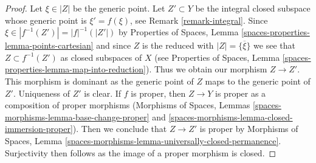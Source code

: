 \documentclass[10pt,a4paper]{amsart}
\theoremstyle{plain}
\theoremstyle{definition}
\theoremstyle{remark}
\numberwithin{equation}{subsection}
\begin{document}
\begin{proof}
Let $\xi \in |Z|$ be the generic point. Let $Z' \subset Y$ be the integral
closed subspace whose generic point is $\xi' = f(\xi)$, see
Remark \ref{remark-integral}. Since $\xi \in |f^{-1}(Z')| = |f|^{-1}(|Z'|)$
by Properties of Spaces, Lemma \ref{spaces-properties-lemma-points-cartesian}
and since $Z$ is the reduced with $|Z| = \overline{\{\xi\}}$
we see that $Z \subset f^{-1}(Z')$ as closed subspaces of $X$ (see
Properties of Spaces, Lemma \ref{spaces-properties-lemma-map-into-reduction}).
Thus we obtain our morphism $Z \to Z'$.
This morphism is dominant as the generic point of $Z$
maps to the generic point of $Z'$. Uniqueness of $Z'$ is clear.
If $f$ is proper, then $Z \to Y$ is proper as a composition
of proper morphisms (Morphisms of Spaces, Lemmas
\ref{spaces-morphisms-lemma-base-change-proper} and
\ref{spaces-morphisms-lemma-closed-immersion-proper}).
Then we conclude that $Z \to Z'$ is proper by
Morphisms of Spaces, Lemma
\ref{spaces-morphisms-lemma-universally-closed-permanence}.
Surjectivity then follows as the image of a proper morphism is closed.
\end{proof}
\end{document}
